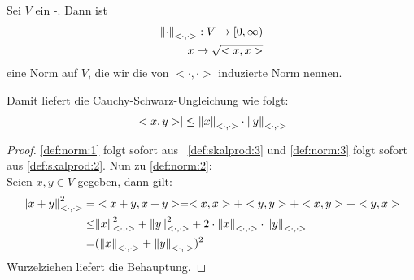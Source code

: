 \begin{Proposition}{%
Sei $V$ ein -. Dann ist
\begin{align*}
	\norm{\cdot}_{<\cdot,\cdot>} : V \rightarrow [0,\infty) \\
	x \mapsto \sqrt{<x,x>}
\end{align*}
eine Norm auf $V$, die wir die von $<\cdot,\cdot>$ induzierte Norm nennen.
}\end{Proposition}

\begin{Bemerkung}{
	Damit liefert die Cauchy-Schwarz-Ungleichung wie folgt:
	\begin{align*}
		\abs{<x,y>} \leq \norm{x}_{<\cdot, \cdot>} \cdot \norm{y}_{<\cdot, \cdot>}
	\end{align*}
}\end{Bemerkung}

\begin{proof}
	\ref{def:norm:1} folgt sofort aus ~\ref{def:skalprod:3} und \ref{def:norm:3} folgt sofort aus 
	\ref{def:skalprod:2}. Nun zu \ref{def:norm:2}: \\
	Seien $x,y \in V$ gegeben, dann gilt:
	\begin{align*}
		\norm{x + y}^2_{<\cdot,\cdot>} = & <x+y, x+y> =
		<x,x> + <y,y> + <x,y> + <y,x> \\
		\leq & \norm{x}^2_{<\cdot,\cdot>} + \norm{y}^2_{<\cdot,\cdot>} 
		+ 2 \cdot \norm{x}_{<\cdot,\cdot>} \cdot \norm{y}_{<\cdot,\cdot>}\\
		=& (\norm{x}_{<\cdot,\cdot>} + \norm{y}_{<\cdot,\cdot>})^2
	\end{align*}
	Wurzelziehen liefert die Behauptung.
\end{proof}

